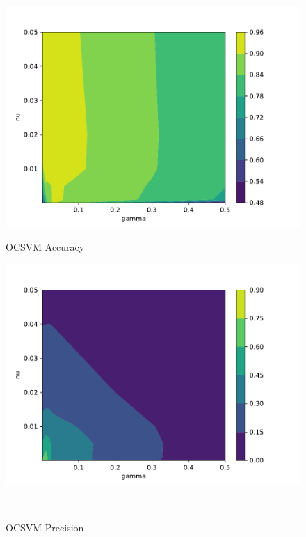 \begin{figure}[!htb] %
    \begin{minipage}[t]{0.5\textwidth}
        \vspace{0pt}
        \includegraphics[width=\textwidth]{images/ocsvm-accuracy.pdf}
        \caption{OCSVM Accuracy}
    \end{minipage}
    \hfill
    \begin{minipage}[t]{0.5\textwidth}
        \vspace{0pt}
        \includegraphics[width=\textwidth]{images/ocsvm-precision.pdf}
        \caption{OCSVM Precision}
    \end{minipage}
    \\

\end{figure}
